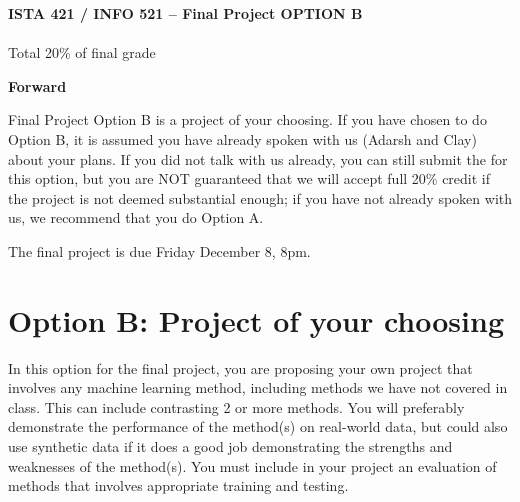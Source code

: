 \documentclass[10pt]{article}
\begin{document}
\begin{center}
    {\Large {\bf ISTA 421 / INFO 521 -- Final Project OPTION B}} \\
     \\
    Total 20\% of final grade \\
    \vspace{1cm}
\end{center}



\vspace{1cm}
{\Large {\bf Forward}}

Final Project Option B is a project of your choosing.  
If you have chosen to do Option B, it is assumed you have already spoken with us (Adarsh and Clay) about your plans.
If you did not talk with us already, you can still submit the for this option, but you are NOT guaranteed that we will accept full 20\% credit if the project is not deemed substantial enough; if you have not already spoken with us, we recommend that you do Option A.

The final project is due Friday December 8, 8pm.



\section*{Option B: Project of your choosing}

In this option for the final project, you are proposing your own project that involves any machine learning method, including methods we have not covered in class.  This can include contrasting 2 or more methods.  You will preferably demonstrate the performance of the method(s) on real-world data, but could also use synthetic data if it does a good job demonstrating the strengths and weaknesses of the method(s).  You must include in your project an evaluation of methods that involves appropriate training and testing.  
\end{document}
